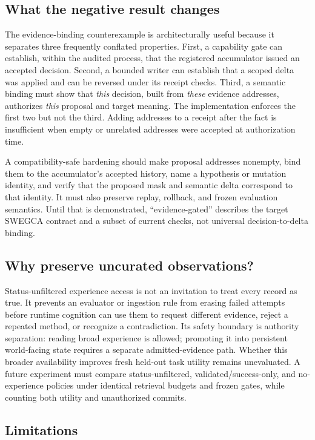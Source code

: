 \documentclass[10pt]{article}
\newcommand{\swegca}{\textsc{SWEGCA}}
\begin{document}
\subsection{What the negative result changes}

The evidence-binding counterexample is architecturally useful because it separates three frequently conflated properties. First, a capability gate can establish, within the audited process, that the registered accumulator issued an accepted decision. Second, a bounded writer can establish that a scoped delta was applied and can be reversed under its receipt checks. Third, a semantic binding must show that \emph{this} decision, built from \emph{these} evidence addresses, authorizes \emph{this} proposal and target meaning. The implementation enforces the first two but not the third. Adding addresses to a receipt after the fact is insufficient when empty or unrelated addresses were accepted at authorization time.

A compatibility-safe hardening should make proposal addresses nonempty, bind them to the accumulator's accepted history, name a hypothesis or mutation identity, and verify that the proposed mask and semantic delta correspond to that identity. It must also preserve replay, rollback, and frozen evaluation semantics. Until that is demonstrated, ``evidence-gated'' describes the target \swegca{} contract and a subset of current checks, not universal decision-to-delta binding.

\subsection{Why preserve uncurated observations?}

Status-unfiltered experience access is not an invitation to treat every record as true. It prevents an evaluator or ingestion rule from erasing failed attempts before runtime cognition can use them to request different evidence, reject a repeated method, or recognize a contradiction. Its safety boundary is authority separation: reading broad experience is allowed; promoting it into persistent world-facing state requires a separate admitted-evidence path. Whether this broader availability improves fresh held-out task utility remains unevaluated. A future experiment must compare status-unfiltered, validated/success-only, and no-experience policies under identical retrieval budgets and frozen gates, while counting both utility and unauthorized commits.

\subsection{Limitations}
\end{document}
